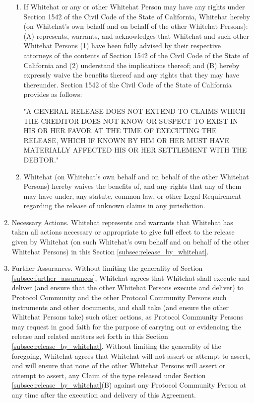 \documentclass{article}
\begin{document}
\begin{enumerate}[label=\Alph*.]
          \begin{enumerate}
              \item If Whitehat or any or other Whitehat Person may have any rights under Section 1542 of the Civil Code of the State of California, Whitehat hereby (on Whitehat's own behalf and on behalf of the other Whitehat Persons): (A) represents, warrants, and acknowledges that Whitehat and such other Whitehat Persons (1) have been fully advised by their respective attorneys of the contents of Section 1542 of the Civil Code of the State of California and (2) understand the implications thereof; and (B) hereby expressly waive the benefits thereof and any rights that they may have thereunder. Section 1542 of the Civil Code of the State of California provides as follows:

                    "A GENERAL RELEASE DOES NOT EXTEND TO CLAIMS WHICH THE CREDITOR DOES NOT KNOW OR SUSPECT TO EXIST IN HIS OR HER FAVOR AT THE TIME OF EXECUTING THE RELEASE, WHICH IF KNOWN BY HIM OR HER MUST HAVE MATERIALLY AFFECTED HIS OR HER SETTLEMENT WITH THE DEBTOR."

              \item Whitehat (on Whitehat's own behalf and on behalf of the other Whitehat Persons) hereby waives the benefits of, and any rights that any of them may have under, any statute, common law, or other Legal Requirement regarding the release of unknown claims in any jurisdiction.

          \end{enumerate}

    \item Necessary Actions. Whitehat represents and warrants that Whitehat has taken all actions necessary or appropriate to give full effect to the release given by Whitehat (on such Whitehat's own behalf and on behalf of the other Whitehat Persons) in this Section \ref{subsec:release_by_whitehat}.

    \item Further Assurances. Without limiting the generality of Section \ref{subsec:further_assurances}, Whitehat agrees that Whitehat shall execute and deliver (and ensure that the other Whitehat Persons execute and deliver) to Protocol Community and the other Protocol Community Persons such instruments and other documents, and shall take (and ensure the other Whitehat Persons take) such other actions, as Protocol Community Persons may request in good faith for the purpose of carrying out or evidencing the release and related matters set forth in this Section \ref{subsec:release_by_whitehat}. Without limiting the generality of the foregoing, Whitehat agrees that Whitehat will not assert or attempt to assert, and will ensure that none of the other Whitehat Persons will assert or attempt to assert, any Claim of the type released under Section \ref{subsec:release_by_whitehat}(B) against any Protocol Community Person at any time after the execution and delivery of this Agreement.

\end{enumerate}
\end{document}
